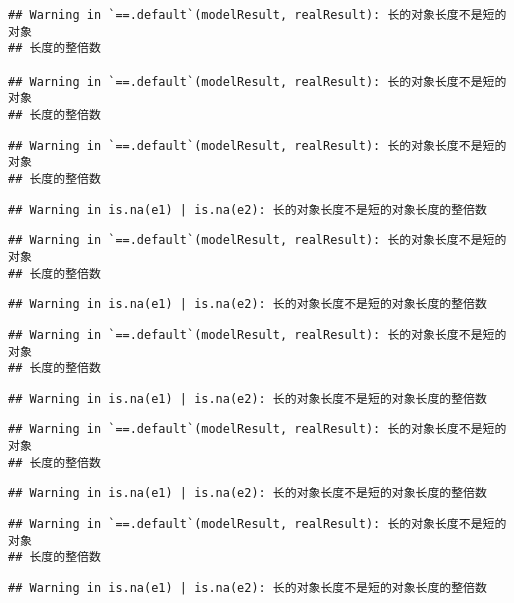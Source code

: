 \documentclass[]{article}
\begin{document}
\begin{verbatim}
## Warning in `==.default`(modelResult, realResult): 长的对象长度不是短的对象
## 长度的整倍数

## Warning in `==.default`(modelResult, realResult): 长的对象长度不是短的对象
## 长度的整倍数
\end{verbatim}

\begin{verbatim}
## Warning in `==.default`(modelResult, realResult): 长的对象长度不是短的对象
## 长度的整倍数
\end{verbatim}

\begin{verbatim}
## Warning in is.na(e1) | is.na(e2): 长的对象长度不是短的对象长度的整倍数
\end{verbatim}

\begin{verbatim}
## Warning in `==.default`(modelResult, realResult): 长的对象长度不是短的对象
## 长度的整倍数
\end{verbatim}

\begin{verbatim}
## Warning in is.na(e1) | is.na(e2): 长的对象长度不是短的对象长度的整倍数
\end{verbatim}

\begin{verbatim}
## Warning in `==.default`(modelResult, realResult): 长的对象长度不是短的对象
## 长度的整倍数
\end{verbatim}

\begin{verbatim}
## Warning in is.na(e1) | is.na(e2): 长的对象长度不是短的对象长度的整倍数
\end{verbatim}

\begin{verbatim}
## Warning in `==.default`(modelResult, realResult): 长的对象长度不是短的对象
## 长度的整倍数
\end{verbatim}

\begin{verbatim}
## Warning in is.na(e1) | is.na(e2): 长的对象长度不是短的对象长度的整倍数
\end{verbatim}

\begin{verbatim}
## Warning in `==.default`(modelResult, realResult): 长的对象长度不是短的对象
## 长度的整倍数
\end{verbatim}

\begin{verbatim}
## Warning in is.na(e1) | is.na(e2): 长的对象长度不是短的对象长度的整倍数
\end{verbatim}
\end{document}
